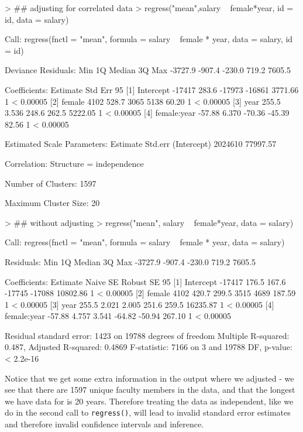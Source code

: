 \documentclass[landscape]{article}
\renewenvironment{Schunk}{\vspace{\topsep}}{\vspace{\topsep}}
\begin{document}
\begin{Schunk}
\begin{Sinput}
> ## adjusting for correlated data
> regress("mean",salary ~ female*year, id = id, data = salary)
\end{Sinput}
\begin{Soutput}
Call:
regress(fnctl = "mean", formula = salary ~ female * year, data = salary, 
    id = id)

Deviance Residuals: 
    Min       1Q   Median       3Q      Max  
-3727.9   -907.4   -230.0    719.2   7605.5  

Coefficients:
                   Estimate  Std Err   95%
[1] Intercept       -17417     283.6    -17973       -16861        3771.66 1  < 0.00005
[2] female            4102     528.7      3065         5138          60.20 1  < 0.00005
[3] year             255.5     3.536     248.6        262.5        5222.05 1  < 0.00005
[4] female:year     -57.88     6.370    -70.36       -45.39          82.56 1  < 0.00005

 Estimated Scale Parameters: 
            Estimate  Std.err
(Intercept)  2024610 77997.57

 Correlation: Structure =  independence 

 Number of Clusters:  1597 

 Maximum Cluster Size:  20 
\end{Soutput}
\begin{Sinput}
> ## without adjusting
> regress("mean", salary ~ female*year, data = salary)
\end{Sinput}
\begin{Soutput}
Call:
regress(fnctl = "mean", formula = salary ~ female * year, data = salary)

Residuals:
    Min      1Q  Median      3Q     Max 
-3727.9  -907.4  -230.0   719.2  7605.5 

Coefficients:
                   Estimate  Naive SE  Robust SE    95%
[1] Intercept       -17417     176.5     167.6       -17745    -17088       10802.86 1  < 0.00005
[2] female            4102     420.7     299.5         3515      4689         187.59 1  < 0.00005
[3] year             255.5     2.021     2.005        251.6     259.5       16235.87 1  < 0.00005
[4] female:year     -57.88     4.757     3.541       -64.82    -50.94         267.10 1  < 0.00005

Residual standard error: 1423 on 19788 degrees of freedom
Multiple R-squared:  0.487,	Adjusted R-squared:  0.4869 
F-statistic:  7166 on 3 and 19788 DF,  p-value: < 2.2e-16
\end{Soutput}
\end{Schunk}
Notice that we get some extra information in the output where we adjusted - we see that there are 1597 unique faculty members in the data, and that the longest we have data for is 20 years. Therefore treating the data as independent, like we do in the second call to \texttt{regress()}, will lead to invalid standard error estimates and therefore invalid confidence intervals and inference. 
\end{document}
